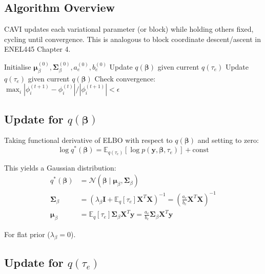 \documentclass[11pt]{article}
\newcommand{\E}{\mathbb{E}}
\newcommand{\N}{\mathcal{N}}
\begin{document}
\subsection{Algorithm Overview}

CAVI updates each variational parameter (or block) while holding others fixed, cycling until convergence. This is analogous to block coordinate descent/ascent in ENEL445 Chapter 4.

\begin{algorithm}
\caption{Coordinate Ascent VI}
\begin{algorithmic}[1]
 \State Initialise $\bm{\mu}_\beta^{(0)}, \bm{\Sigma}_\beta^{(0)}, a_e^{(0)}, b_e^{(0)}$
    \State Update $q(\bm{\beta})$ given current $q(\tau_e)$
    \State Update $q(\tau_e)$ given current $q(\bm{\beta})$
    \State Check convergence: $\max_i |\phi_i^{(t+1)} - \phi_i^{(t)}| / |\phi_i^{(t+1)}| < \epsilon$
\EndFor
\end{algorithmic}
\end{algorithm}

\subsection{Update for \texorpdfstring{$q(\bm{\beta})$}{q(beta)}}

Taking functional derivative of ELBO with respect to $q(\bm{\beta})$ and setting to zero:
\begin{equation}
\log q^*(\bm{\beta}) = \E_{q(\tau_e)}[\log p(\bm{y}, \bm{\beta}, \tau_e)] + \text{const}
\end{equation}

This yields a Gaussian distribution:
\begin{align}
q^*(\bm{\beta}) &= \N(\bm{\beta} \mid \bm{\mu}_\beta, \bm{\Sigma}_\beta)\\
\bm{\Sigma}_\beta &= \left(\lambda_\beta \bm{I} + \E_q[\tau_e] \bm{X}^T\bm{X}\right)^{-1} = \left(\frac{a_e}{b_e} \bm{X}^T\bm{X}\right)^{-1} \label{eq:cavi_Sigma}\\
\bm{\mu}_\beta &= \E_q[\tau_e] \bm{\Sigma}_\beta \bm{X}^T\bm{y} = \frac{a_e}{b_e} \bm{\Sigma}_\beta \bm{X}^T\bm{y} \label{eq:cavi_mu}
\end{align}

For flat prior ($\lambda_\beta = 0$).

\subsection{Update for \texorpdfstring{$q(\tau_e)$}{q(tau_e)}}
\end{document}
